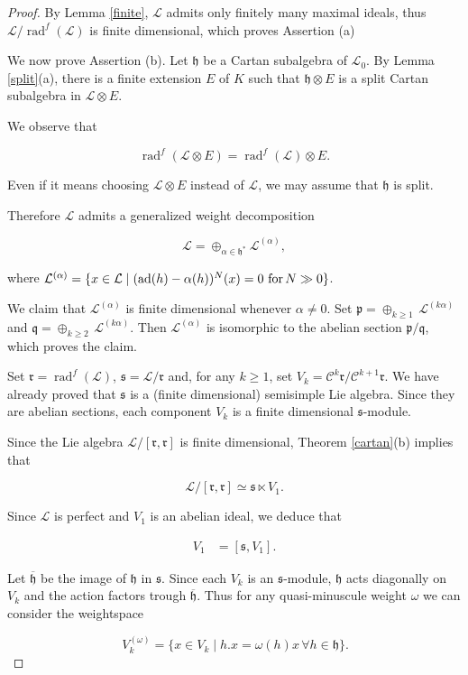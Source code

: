 \documentclass[11pt, letterpaper, reqno]{amsart}
\theoremstyle{definition}
\newcommand{\ad}{\operatorname{ad}}
\newcommand{\rad}{\operatorname{rad}}
\newcommand{\cC}{\mathcal C}
\newcommand{\cL}{\mathcal L}
\newcommand{\fh}{\mathfrak{h}}
\newcommand{\fp}{\mathfrak{p}}
\newcommand{\fq}{\mathfrak{q}}
\newcommand{\fr}{\mathfrak{r}}
\newcommand{\fs}{\mathfrak{s}}
\begin{document}
\begin{proof} By Lemma \ref{finite}, $\cL$ admits only finitely many maximal ideals, thus $\cL/\rad^f(\cL)$ is finite dimensional, which proves Assertion (a)

We now prove Assertion (b). 
Let $\fh$ be a Cartan subalgebra 
of  $\cL_0$. By Lemma \ref{split}(a), 
there is a finite extension $E$ of $K$ such that
$\fh\otimes E$ is a split Cartan subalgebra
in $\cL\otimes E$. 

We observe that  

$$\rad^f(\cL\otimes E)=\rad^f(\cL)\otimes E.$$

\noindent Even if it means choosing $\cL\otimes E$ instead of $\cL$, we may assume that $\fh$ is split.

Therefore $\cL$ admits a generalized weight decomposition

$$\cL=\oplus_{\alpha\in \fh^*}\cL^{(\alpha)},$$

\noindent where $\cL^{(\alpha)}=\{x\in\cL\mid 
(\ad(h)-\alpha(h))^N(x)=0 {\rm\,\, for\,} N\gg0\}$.

We claim that $\cL^{(\alpha)}$ is finite dimensional whenever $\alpha\neq 0$.
Set $\fp=\oplus_{k\geq 1}\,\cL^{(k\alpha)}$
and $\fq=\oplus_{k\geq 2}\,\cL^{(k\alpha)}$.
Then $\cL^{(\alpha)}$ is isomorphic to the abelian section $\fp/\fq$, which proves the claim.

Set $\fr=\rad^f(\cL)$, $\fs=\cL/\fr$
and, for any $k\geq 1$, set 
$V_k=\cC^k\fr/\cC^{k+1} \fr$.
We have already proved that $\fs$ is a 
(finite dimensional) semisimple Lie algebra.
Since they are abelian sections, each component $V_k$ is a finite dimensional $\fs$-module.

Since the Lie algebra $\cL/[\fr,\fr]$ is finite dimensional,
Theorem \ref{cartan}(b) implies that

$$\cL/[\fr,\fr]\simeq \fs\ltimes V_1.$$

\noindent Since $\cL$ is perfect
and $V_1$  is an abelian ideal, we deduce that

\begin{align}
V_1&=[\fs, V_1].
\end{align}

Let $\overline{\fh}$ be the image of $\fh$
in $\fs$. Since each  $V_k$ is an $\fs$-module,
$\fh$ acts diagonally  on $V_k$ 
and the action factors trough $\overline{\fh}$.
Thus for any quasi-minuscule weight 
$\omega$ we can consider the weightspace

$$\,V_k^{(\omega)}=\{x\in V_k\mid h.x=\omega(h)x
\,\forall h\in\fh\}.$$


\end{proof}
\end{document}
